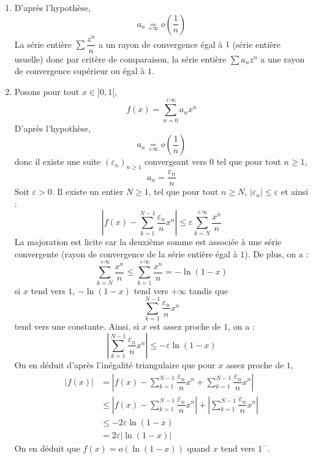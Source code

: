 \documentclass[a4paper,twoside,french,11pt]{VcCours}
\begin{document}
\begin{corr} 
\begin{enumerate}
\item D'après l'hypothèse,
$$ a_n \underset{+ \infty}{=} o \left(\dfrac{1}{n}\right)$$
La série entière $\sum \dfrac{z^n}{n}$ a un rayon de convergence égal à $1$ (série entière usuelle) donc par critère de comparaison, la série entière $\sum a_n z^n$ a une rayon de convergence supérieur ou égal à $1$.
\item Posons pour tout $x \in ]0,1[$,
$$ f(x) = \sum_{n=0}^{+ \infty} a_n x^n$$
D'après l'hypothèse, 
$$ a_n \underset{+ \infty}{=} o \left(\dfrac{1}{n}\right)$$
donc il existe une suite $(\varepsilon_n)_{n \geq 1}$ convergeant vers $0$ tel que pour tout $n \geq 1$,
$$ a_n = \dfrac{\varepsilon_n}{n}$$
Soit $\varepsilon>0$. Il existe un entier $N \geq 1$, tel que pour tout $n \geq N$, $\vert \varepsilon_n \vert \leq \varepsilon$ et ainsi :
$$ \left\vert f(x) - \sum_{k=1}^{N-1}  \dfrac{\varepsilon_n}{n}x^n \right\vert \leq \varepsilon \sum_{k=N}^{+ \infty} \dfrac{x^n}{n}$$
La majoration est licite car la deuxième somme est associée à une série convergente (rayon de convergence de la série entière égal à $1$). De plus, on a :
$$ \sum_{k=N}^{+ \infty} \dfrac{x^n}{n} \leq \sum_{k=1}^{+ \infty} \dfrac{x^n}{n} =  -\ln(1-x)$$
si $x$ tend vers $1$, $-\ln(1-x)$ tend vers $+ \infty$ tandis que 
$$ \sum_{k=1}^{N-1} \dfrac{\varepsilon_n}{n}x^n$$
tend vers une constante. Ainsi, si $x$ est assez proche de $1$, on a :
$$ \left\vert \sum_{k=1}^{N-1}  \dfrac{\varepsilon_n}{n} x^n \right\vert \leq -\varepsilon \ln(1-x)$$
On en déduit d'après l'inégalité triangulaire que pour $x$ assez proche de $1$,
\begin{align*}
\vert f(x) \vert & =  \left\vert f(x) - \sum_{k=1}^{N-1} \dfrac{\varepsilon_n}{n} x^n +  \sum_{k=1}^{N-1}  \dfrac{\varepsilon_n}{n} x^n \right\vert \\
& \leq  \left\vert f(x) - \sum_{k=1}^{N-1} \dfrac{\varepsilon_n}{n}x^n \right\vert +  \left\vert\sum_{k=1}^{N-1}  \dfrac{\varepsilon_n}{n}x^n\right\vert \\
& \leq -2 \varepsilon \ln(1-x) \\
& = 2 \varepsilon \vert \ln(1-x) \vert
\end{align*}
On en déduit que $f(x)= o(\ln(1-x))$ quand $x$ tend vers $1^{-}$.
\end{enumerate}
\end{corr}
\end{document}
